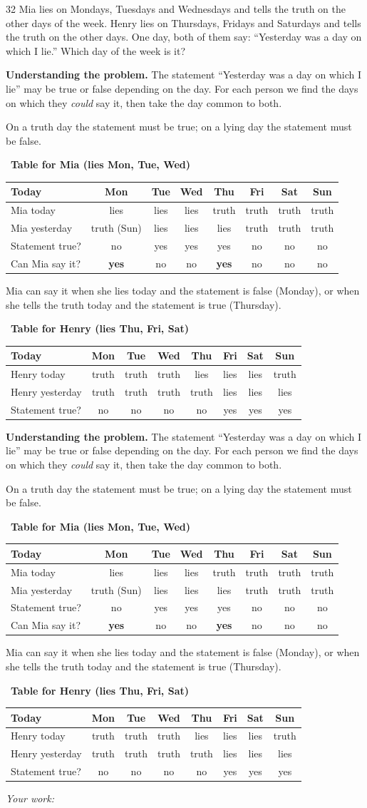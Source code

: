 \documentclass[11pt]{article}
\newif\ifsol \soltrue
\newenvironment{probbox}[2]{\begin{probboxT}{#1}{#2}}{\end{probboxT}}
\newcommand{\StuProb}[2]{\begin{probboxS}{#1}{#2}\StuProbBody\end{probboxS}}
\newcommand{\probsol}[1]{%
  \begin{lrbox}{\solmeasure}\begin{minipage}{\dimexpr\linewidth-24pt\relax}#1\end{minipage}\end{lrbox}%
  \ifsol
    \begin{solbox}#1\end{solbox}%
  \else
    \setlength{\solht}{\dimexpr\ht\solmeasure+\dp\solmeasure+0.85cm\relax}%
    \ifdim\solht<1.35cm\setlength{\solht}{1.35cm}\fi
    \ifdim\solht>\StudentMaxWork\setlength{\solht}{\StudentMaxWork}\fi
    \par\noindent\begin{minipage}{\linewidth}%
    \expandafter\StuProb\StuProbArgs
    \begin{tcolorbox}[colback=white,colframe=Line,boxrule=0.8pt,arc=5pt,
      left=8pt,right=8pt,top=4pt,bottom=4pt,height=\solht]{\footnotesize\color{Slate}\itshape\WorkWord}\end{tcolorbox}%
    \end{minipage}\par\medskip
  \fi}
\newlength{\StudentMaxWork}\setlength{\StudentMaxWork}{4.5cm}
\newcommand{\step}[2]{\par\smallskip\noindent{\bfseries\color{tmBlue!85!black}\StepWord~#1.}\ {\bfseries #2}\par\nopagebreak}
\def\WorkWord{Your work:}
\def\StepWord{Step}
\begin{document}
\begin{probbox}{32}{\relax}
Mia lies on Mondays, Tuesdays and Wednesdays and tells the truth on the other days of the week. Henry lies on Thursdays, Fridays and
Saturdays and tells the truth on the other days. One day, both of them say: ``Yesterday was a day on which I lie.'' Which day of the
week is it?
\end{probbox}
\probsol{
\textbf{Understanding the problem.} The statement ``Yesterday was a day on which I lie'' may be true or false depending on the day.
For each person we find the days on which they \emph{could} say it, then take the day common to both.
\begin{recallbox}On a truth day the statement must be true; on a lying day the statement must be false.\end{recallbox}
\step{1}{Table for Mia (lies Mon, Tue, Wed)}
\begin{center}\small
\begin{tabular}{|l|c|c|c|c|c|c|c|}
\hline
\rowcolor{tmBlue!10} Today & Mon & Tue & Wed & Thu & Fri & Sat & Sun\\ \hline
Mia today & lies & lies & lies & truth & truth & truth & truth\\ \hline
Mia yesterday & truth (Sun) & lies & lies & lies & truth & truth & truth\\ \hline
Statement true? & no & yes & yes & yes & no & no & no\\ \hline
Can Mia say it? & \textbf{yes} & no & no & \textbf{yes} & no & no & no\\ \hline
\end{tabular}
\end{center}
Mia can say it when she lies today and the statement is false (Monday), or when she tells the truth today and the statement is true
(Thursday).
\step{2}{Table for Henry (lies Thu, Fri, Sat)}
\begin{center}\small
\begin{tabular}{|l|c|c|c|c|c|c|c|}
\hline
\rowcolor{tmBlue!10} Today & Mon & Tue & Wed & Thu & Fri & Sat & Sun\\ \hline
Henry today & truth & truth & truth & lies & lies & lies & truth\\ \hline
Henry yesterday & truth & truth & truth & truth & lies & lies & lies\\ \hline
Statement true? & no & no & no & no & yes & yes & yes\\ \hline

\end{tabular}
\end{center}}
\end{document}
